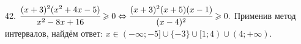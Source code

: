 42. $\cfrac{(x+3)^2(x^2+4x-5)}{x^2-8x+16}\geqslant0\Leftrightarrow\cfrac{(x+3)^2(x+5)(x-1)}{(x-4)^2}\geqslant0.$ Применив метод интервалов, найдём ответ: $x\in(-\infty;-5]\cup\{-3\}\cup[1;4)\cup(4;+\infty).$
\begin{figure}[ht!]
\end{figure}\\
